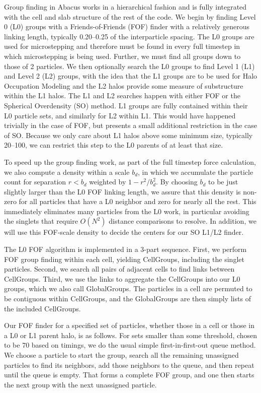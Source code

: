 Group finding in Abacus works in a hierarchical fashion and is fully
integrated with the cell and slab structure of the rest of the code.
We begin by finding Level 0 (L0) groups with a Friends-of-Friends
(FOF) finder with a relatively generous linking length, typically
0.20--0.25 of the interparticle spacing.  The L0 groups are used
for microstepping and therefore must be found in every full timestep
in which microstepping is being used.  Further, we must find all
groups down to those of 2 particles.  We then optionally search the
L0 groups to find Level 1 (L1) and Level 2 (L2) groups, with the
idea that the L1 groups are to be used for Halo Occupation Modeling
and the L2 halos provide some measure of substructure within the
L1 halos.  The L1 and L2 searches happen with either FOF or the
Spherical Overdensity (SO) method.  L1 groups are fully contained
within their L0 particle sets, and similarly for L2 within L1.  This
would have happened trivially in the case of FOF, but presents a
small additional restriction in the case of SO.  Because we only
care about L1 halos above some minimum size, typically 20--100, we
can restrict this step to the L0 parents of at least that size.

To speed up the group finding work, as part of the full timestep
force calculation, we also compute a density within a scale $b_d$,
in which we accumulate the particle count for separation $r<b_d$
weighted by $1-r^2/b_d^2$.  By choosing $b_d$ to be just slightly
larger than the L0 FOF linking length, we assure that this density
is non-zero for all particles that have a L0 neighbor and zero for
nearly all the rest.  This immediately eliminates many particles
from the L0 work, in particular avoiding the singlets that require
$O(N^2)$ distance comparisons to resolve.  In addition, we will use
this FOF-scale density to decide the centers for our SO L1/L2 finder.

The L0 FOF algorithm is implemented in a 3-part sequence.  First,
we perform FOF group finding within each cell, yielding CellGroups,
including the singlet particles.  Second, we search all pairs of
adjacent cells to find links between CellGroups.  Third, we use the
links to aggregate the CellGroups into our L0 groups, which we also
call GlobalGroups.  The particles in a cell are permuted to be
contiguous within CellGroups, and the GlobalGroups are then simply
lists of the included CellGroups.

Our FOF finder for a specified set of particles, whether those in a 
cell or those in a L0 or L1 parent halo, is as follows.  For sets smaller
than some threshold, chosen to be 70 based on timings, we do the 
usual simple first-in-first-out queue method.  We choose a particle
to start the group, search all the remaining unassigned particles to
find its neighbors, add those neighbors to the queue, and then repeat
until the queue is empty.  That forms a complete FOF group, and one
then starts the next group with the next unassigned particle.


